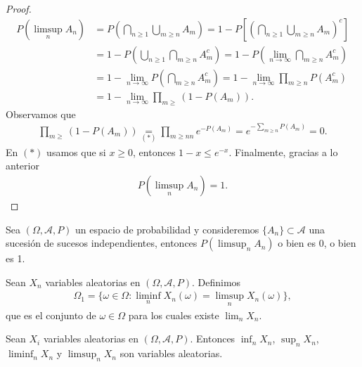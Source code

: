 \begin{proof}
    \begin{align*}
        P\left( \limsup_n A_n \right) &= P \left( \bigcap_{n \ge 1} \bigcup_{m \ge n} A_m \right) = 1 - P\left[ \left( \bigcap_{n \ge 1} \bigcup_{m \ge n} A_m \right)^c \right] \\
        &= 1 - P\left(\bigcup_{n \ge 1} \bigcap_{m \ge n} A_m^c\right) = 1 - P\left(\lim_{n \to \infty} \bigcap_{m \ge n} A_m^c\right) \\
        &= 1 - \lim_{n \to \infty } P\left( \bigcap_{m \ge n} A_m^c\right) = 1 - \lim_{n \to \infty} \prod_{m \ge n} P(A_m^c) \\
        &= 1 - \lim_{n \to \infty} \prod_{m \ge} (1 - P(A_m)).
    \end{align*}
    Observamos que
    \begin{align*}
        \prod_{m \ge} (1 - P(A_m)) \underset{(*)}{=} \prod_{m \ge nn} e^{-P(A_m)}= e^{-\sum_{m \ge n}P(A_m)} = 0.
    \end{align*}
    En $(*)$ usamos que si $x \ge 0$, entonces $1 - x \leq e^{-x}$. Finalmente, gracias a lo anterior
        \begin{align*}
        P\left( \limsup_n A_n \right) = 1.
    \end{align*}
\end{proof}

\begin{cor}
    Sea $(\Omega,\mathcal{A},P)$ un espacio de probabilidad y consideremos $\{A_n\} \subset \mathcal{A}$ una sucesión de sucesos independientes, entonces $P\left( \limsup_n A_n\right)$ o bien es 0, o bien es 1.
\end{cor}
\noindent Sean $X_n$ variables aleatorias en $(\Omega, \mathcal{A}, P)$. Definimos
\begin{align*}
    \Omega_1 = \{ \omega \in \Omega : \liminf_n X_n(\omega) = \limsup_n X_n(\omega) \},
\end{align*}
que es el conjunto de $\omega \in \Omega$ para los cuales existe $\lim_n X_n$.

\begin{teo}
    Sean $X_i$ variables aleatorias en $(\Omega, \mathcal{A}, P)$. Entonces $\inf_n X_n$, $\sup_n X_n$, \newline $\liminf_n X_n$ y $\limsup_n X_n$ son variables aleatorias.
\end{teo}

